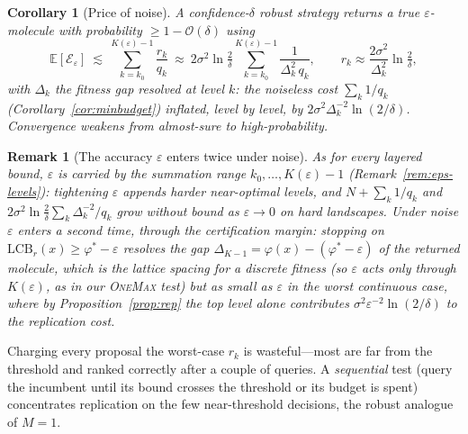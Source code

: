 \documentclass[11pt,a4paper]{article}
\newtheorem{corollary}[theorem]{Corollary}
\newtheorem{remark}[theorem]{Remark}
\newcommand{\E}{\mathbb{E}}
\newcommand{\phist}{\varphi^*}
\newcommand{\evals}{\mathcal{E}}
\begin{document}
\begin{corollary}[Price of noise]\label{cor:priceofnoise}
  A confidence-$\delta$ robust strategy returns a true
  $\varepsilon$-molecule with probability $\ge1-\mathcal O(\delta)$ using
  \[
    \E[\evals_\varepsilon]\ \lesssim\ \sum_{k=k_0}^{K(\varepsilon)-1}\frac{r_k}{q_k}
    \ \approx\ 2\sigma^2\ln\tfrac2\delta
       \sum_{k=k_0}^{K(\varepsilon)-1}\frac1{\Delta_k^2\,q_k},
    \qquad r_k\approx\frac{2\sigma^2}{\Delta_k^2}\ln\tfrac2\delta,
  \]
  with $\Delta_k$ the fitness gap resolved at level $k$: the noiseless
  cost $\sum_k1/q_k$ (Corollary~\ref{cor:minbudget}) inflated, level by level, by
  $2\sigma^2\Delta_k^{-2}\ln(2/\delta)$.  Convergence weakens from
  almost-sure to high-probability.
\end{corollary}

\begin{remark}[The accuracy $\varepsilon$ enters twice under noise]\label{rem:eps}
  As for every layered bound, $\varepsilon$ is carried by the summation
  range $k_0,\dots,K(\varepsilon)-1$ (Remark~\ref{rem:eps-levels}):
  tightening $\varepsilon$ appends harder near-optimal levels, and
  $N+\sum_k1/q_k$ and $2\sigma^2\ln\tfrac2\delta\sum_k\Delta_k^{-2}/q_k$
  grow without bound as $\varepsilon\to0$ on hard landscapes.  Under noise
  $\varepsilon$ enters a \emph{second} time, through the certification
  margin: stopping on $\mathrm{LCB}_r(x)\ge\phist-\varepsilon$ resolves the
  gap $\Delta_{K-1}=\varphi(x)-(\phist-\varepsilon)$ of the returned
  molecule, which is the lattice spacing for a discrete fitness (so
  $\varepsilon$ acts only through $K(\varepsilon)$, as in our
  \textsc{OneMax} test) but as small as $\varepsilon$ in the worst
  continuous case, where by Proposition~\ref{prop:rep} the top level alone contributes
  $\sigma^2\varepsilon^{-2}\ln(2/\delta)$ to the replication cost.
\end{remark}

Charging every proposal the worst-case $r_k$ is wasteful---most are far
from the threshold and ranked correctly after a couple of queries.  A
\emph{sequential} test (query the incumbent until its bound crosses the
threshold or its budget is spent) concentrates replication on the few
near-threshold decisions, the robust analogue of $M=1$.
\end{document}
